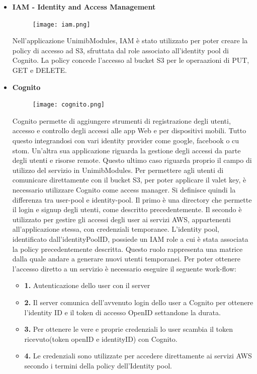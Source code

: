 \documentclass[12pt]{article}
\begin{document}
\begin{itemize}
				\item \textbf{IAM - Identity and Access Management}
				\begin{figure}[H]
					\texttt{[image: iam.png]}
				\end{figure}
				Nell'applicazione UnimibModules, IAM è stato utilizzato per poter creare la policy di accesso ad S3, sfruttata dal role associato all'identity pool di Cognito. La policy concede l'accesso al bucket S3 per le operaazioni di PUT, GET e DELETE.
				\item \textbf{Cognito}
				\begin{figure}[H]
					\texttt{[image: cognito.png]}
				\end{figure}
				Cognito permette di aggiungere strumenti di registrazione degli utenti, accesso e controllo degli accessi alle app Web e per dispositivi mobili. Tutto questo integrandosi con vari identity provider come google, facebook o cu
				stom. Un'altra sua applicazione riguarda la gestione degli accessi da parte degli utenti e risorse remote. Questo ultimo caso riguarda proprio il campo di utilizzo del servizio in UnimibModules. Per permettere agli utenti di comunicare direttamente con il bucket S3, per poter applicare il valet key, è necessario utilizzare Cognito come access manager. Si definisce quindi la differenza tra user-pool e identity-pool. Il primo è una directory che permette il login e signup degli utenti, come descritto precedentemente. Il secondo è utilizzato per gestire gli accessi  degli user  ai servizi AWS, appartenenti all'applicazione stessa, con credenziali temporanee. L'identity pool, identificato dall'identityPoolID, possiede un IAM role a cui è stata associata la policy precedentemente descritta. Questo ruolo rappresenta una matrice dalla quale andare a generare nuovi utenti temporanei. Per poter ottenere l'accesso diretto a un servizio è necessario eseguire il seguente work-flow:
				\begin{itemize}
					\item \textbf{1.} Autenticazione dello user con il server
					\item \textbf{2.} Il server comunica dell'avvenuto login dello user a Cognito per ottenere l'identity ID e il token di accesso OpenID settandone la durata.
					\item \textbf{3.} Per ottenere le vere e proprie credenziali lo user scambia il token ricevuto(token openID e identityID) con Cognito.
					\item \textbf{4.} Le credenziali sono utilizzate per accedere direttamente ai servizi AWS secondo i termini della policy dell'Identity pool. 

\end{itemize}
\end{itemize}
\end{document}
